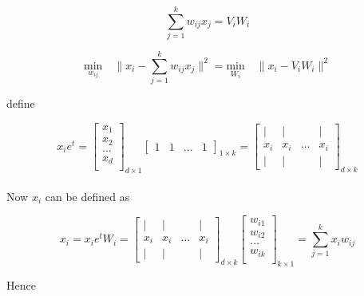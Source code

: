 \documentclass{article}
\begin{document}
    \begin{equation*}
        \sum_{j=1}^k w_{ij} x_j = V_i W_i
    \end{equation*}

    \begin{equation*}
            \underset{w_{ij}}{\text{min}} \quad \lVert x_i - \sum_{j=1}^k w_{ij} x_j \rVert^2
            = 
            \underset{W_i}{\text{min}} \quad \lVert x_i - V_i W_i \rVert^2
    \end{equation*}

    define

    \[
        x_i e^t =
        \begin{bmatrix}
            x_1 \\
            x_2 \\
            \dots \\
            x_d \\
        \end{bmatrix}_{d \times 1}
        \begin{bmatrix}
            1 & 1 & \dots & 1
        \end{bmatrix}_{1 \times k}
        =
        \begin{bmatrix}
            |   & |   &       & | \\
            x_i & x_i & \dots & x_i\\
            |   & |   &       & |
        \end{bmatrix}_{d \times k}
    \]\\
    
    Now $x_i$ can be defined as

    \[
        x_i = x_i e^t W_i =
        \begin{bmatrix}
            |   & |   &       & | \\
            x_i & x_i & \dots & x_i\\
            |   & |   &       & |
        \end{bmatrix}_{d \times k}
        \begin{bmatrix}
            w_{i1}\\
            w_{i2}\\
            \dots \\
            w_{ik}\\
        \end{bmatrix}_{k \times 1}
        =
        \sum_{j=1}^k x_i w_{ij}
    \]

    Hence
\end{document}
